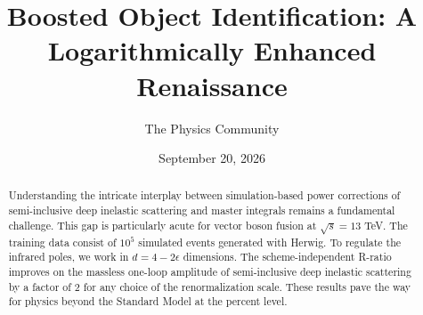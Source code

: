 \documentclass[11pt]{article}
\title{Boosted Object Identification: A Logarithmically Enhanced Renaissance}
\author{The Physics Community}
\date{September 20, 2026}
\begin{document}
\maketitle
\begin{abstract}
Understanding the intricate interplay between simulation-based power
corrections of semi-inclusive deep inelastic scattering and master
integrals remains a fundamental challenge. This gap is particularly
acute for vector boson fusion at $\sqrt{s} = 13$ TeV. The training data
consist of $10^5$ simulated events generated with Herwig. To regulate
the infrared poles, we work in $d = 4 - 2\epsilon$ dimensions. The
scheme-independent R-ratio improves on the massless one-loop amplitude
of semi-inclusive deep inelastic scattering by a factor of 2 for any
choice of the renormalization scale. These results pave the way for
physics beyond the Standard Model at the percent level.
\end{abstract}
\tableofcontents






\nocite{*}


\end{document}
